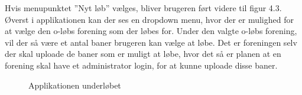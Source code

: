 Hvis menupunktet ”Nyt løb” vælges, bliver brugeren ført videre til figur 4.3. Øverst i applikationen kan der ses en dropdown menu, hvor der er mulighed for at vælge den o-løbs forening som der løbes for. Under den valgte o-løbs forening, vil der så være et antal baner brugeren kan vælge at løbe. Det er foreningen selv der skal uploade de baner som er muligt at løbe, hvor det så er planen at en forening skal have et administrator login, for at kunne uploade disse baner.

\begin{figure}
	\centering
	\begin{minipage}{.5\textwidth}
		\centering
		\caption{Applikationen underløbet}
		\label{fig:test1}
	\end{minipage}%
	\begin{minipage}{.5\textwidth}
		\centering

\end{minipage}
\end{figure}
